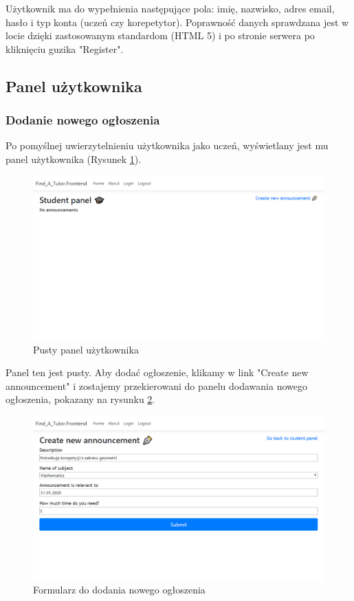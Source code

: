 \documentclass[12pt]{article}
\numberwithin{figure}{section}
\begin{document}
\begin{sloppypar}
Użytkownik ma do wypełnienia następujące pola: imię, nazwisko, adres email, hasło i typ konta (uczeń czy korepetytor). Poprawność danych sprawdzana jest w locie dzięki zastosowanym standardom (HTML 5) i po stronie serwera po kliknięciu guzika "Register".

\subsection{Panel użytkownika}
\subsubsection{Dodanie nowego ogłoszenia}
Po pomyślnej uwierzytelnieniu użytkownika jako uczeń, wyświetlany jest mu panel użytkownika (Rysunek \ref{fig:student-empty}).
\begin{figure}[!htbp] 
    \centering
    \includegraphics[width=1\textwidth]{images/chapter_4/student-empty.png}
    \caption{Pusty panel użytkownika}
    \label{fig:student-empty}
\end{figure}

Panel ten jest pusty. Aby dodać ogłoszenie, klikamy w link "Create new announcement" i zostajemy przekierowani do panelu dodawania nowego ogłoszenia, pokazany na rysunku \ref{fig:create-new}.
\begin{figure}[!htbp] 
    \centering
    \includegraphics[width=1\textwidth]{images/chapter_4/create-new.png}
    \caption{Formularz do dodania nowego ogłoszenia}
    \label{fig:create-new}
\end{figure}


\end{sloppypar}
\end{document}
